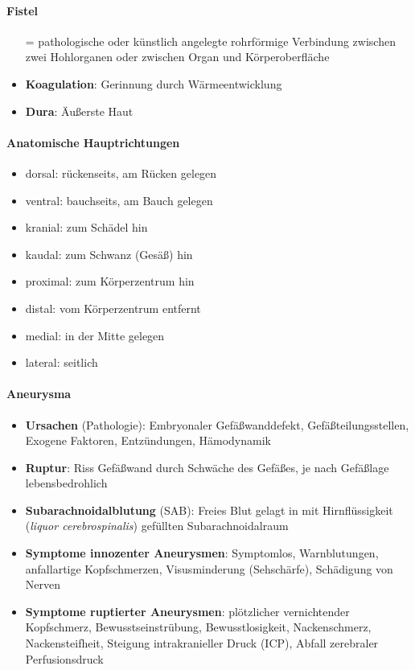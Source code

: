 \paragraph{Fistel}
\begin{itemize}
  \item[=] pathologische oder künstlich angelegte rohrförmige Verbindung zwischen zwei Hohlorganen oder zwischen Organ und Körperoberfläche
  \item \textbf{Koagulation}: Gerinnung durch Wärmeentwicklung
  \item \textbf{Dura}: Äußerste Haut
\end{itemize}

\paragraph{Anatomische Hauptrichtungen}
\begin{itemize}
  \item dorsal: rückenseits, am Rücken gelegen
  \item ventral: bauchseits, am Bauch gelegen
  \item kranial: zum Schädel hin
  \item kaudal: zum Schwanz (Gesäß) hin
  \item proximal: zum Körperzentrum hin
  \item distal: vom Körperzentrum entfernt
  \item medial: in der Mitte gelegen
  \item lateral: seitlich
\end{itemize}

\paragraph{Aneurysma}
\begin{itemize}
  \item \textbf{Ursachen} (Pathologie): Embryonaler Gefäßwanddefekt, Gefäß\-teilungs\-stel\-len, Exo\-gene Faktoren, Entzündungen, Hämodynamik
  \item \textbf{Ruptur}: Riss Gefäßwand durch Schwäche des Gefäßes, je nach Gefäßlage lebensbedrohlich
  \item \textbf{Subarachnoidalblutung} (SAB): Freies Blut gelagt in mit Hirnflüssigkeit (\emph{liquor cerebrospinalis}) gefüllten Subarachnoidalraum
  \item \textbf{Symptome innozenter Aneurysmen}: Symptomlos, Warnblutungen, anfallartige Kopfschmerzen, Visusminderung (Sehschärfe), Schädigung von Nerven
  \item \textbf{Symptome ruptierter Aneurysmen}: plötzlicher vernichtender Kopfschmerz, Bewusstseinstrübung, Bewusstlosigkeit, Nackenschmerz, Nackensteifheit, Steigung intrakranieller Druck (ICP), Abfall zerebraler Perfusionsdruck
\end{itemize}